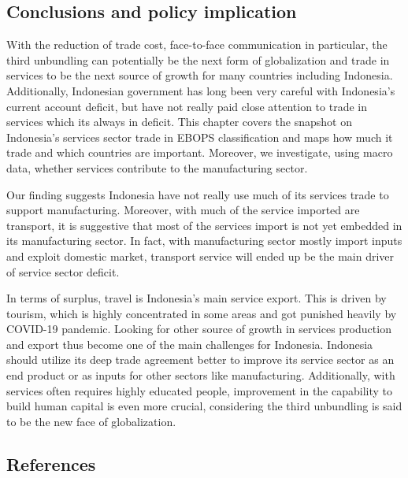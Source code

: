 \documentclass[
  letterpaper,
  DIV=11,
  numbers=noendperiod]{scrartcl}
\begin{document}
\subsection{Conclusions and policy
implication}\label{conclusions-and-policy-implication}

With the reduction of trade cost, face-to-face communication in
particular, the third unbundling can potentially be the next form of
globalization and trade in services to be the next source of growth for
many countries including Indonesia. Additionally, Indonesian government
has long been very careful with Indonesia's current account deficit, but
have not really paid close attention to trade in services which its
always in deficit. This chapter covers the snapshot on Indonesia's
services sector trade in EBOPS classification and maps how much it trade
and which countries are important. Moreover, we investigate, using macro
data, whether services contribute to the manufacturing sector.

Our finding suggests Indonesia have not really use much of its services
trade to support manufacturing. Moreover, with much of the service
imported are transport, it is suggestive that most of the services
import is not yet embedded in its manufacturing sector. In fact, with
manufacturing sector mostly import inputs and exploit domestic market,
transport service will ended up be the main driver of service sector
deficit.

In terms of surplus, travel is Indonesia's main service export. This is
driven by tourism, which is highly concentrated in some areas and got
punished heavily by COVID-19 pandemic. Looking for other source of
growth in services production and export thus become one of the main
challenges for Indonesia. Indonesia should utilize its deep trade
agreement better to improve its service sector as an end product or as
inputs for other sectors like manufacturing. Additionally, with services
often requires highly educated people, improvement in the capability to
build human capital is even more crucial, considering the third
unbundling is said to be the new face of globalization.

\subsection*{References}\label{references}
\end{document}

